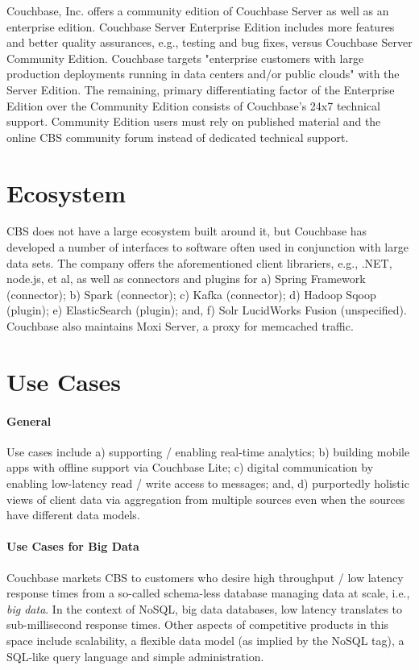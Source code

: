 \documentclass[9pt,twocolumn,twoside]{styles/osajnl}
\newcommand{\TODO}[2][]{\todo[color=red!10,inline,#1]{#2}}
\newcommand{\CE}{\TODO{Citation}}
\begin{document}
Couchbase, Inc. offers a community edition of Couchbase
Server as well as an enterprise edition.  Couchbase Server Enterprise Edition
includes more features and better quality assurances, e.g., testing and bug
fixes, versus Couchbase Server Community Edition.  Couchbase targets
"enterprise customers with large production deployments running in data centers
and/or public clouds" \CE with the Server Edition. The remaining, primary differentiating factor of the Enterprise Edition over the Community Edition consists of Couchbase's 24x7 technical support. Community Edition users must rely on published material and the online CBS community forum instead of dedicated technical support.  \cite{www-downloads-cbsinc}

\section{Ecosystem} CBS does not have a large ecosystem built around it,
but Couchbase has developed a number of interfaces to software often used in conjunction with large data sets.  The
company offers the aforementioned client librariers, e.g., .NET, node.js, et al, as well as connectors and plugins for a) Spring Framework (connector); b) Spark (connector); c) Kafka (connector); d) Hadoop Sqoop (plugin); e) ElasticSearch (plugin); and, f) Solr LucidWorks Fusion (unspecified).  Couchbase also maintains Moxi Server, a proxy for memcached traffic.\cite{www-downloads-cbsinc}

\section{Use Cases}
\paragraph{General}
Use cases include a) supporting / enabling real-time analytics; b) building mobile apps with offline support via Couchbase Lite; c) digital communication by enabling low-latency read / write access to messages; and, d) purportedly holistic views of client data via aggregation from multiple sources even when the sources have different data models.

\paragraph{Use Cases for Big Data} Couchbase markets CBS to customers who
desire high throughput / low latency response times from a so-called schema-less
database managing data at scale, i.e., \textit{big data}. In the context of
NoSQL, big data databases, low latency translates to sub-millisecond response
times.  Other aspects of competitive products in this space include scalability,
a flexible data model (as implied by the NoSQL tag), a SQL-like query language
and simple administration.\cite{www-cbsintro-cbsinc}
\end{document}
